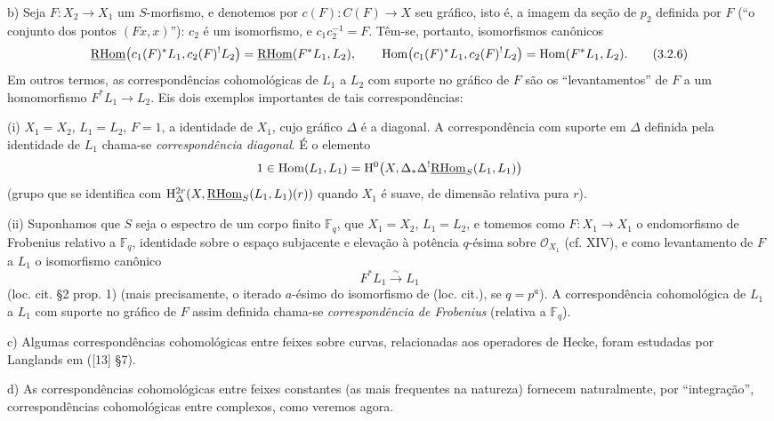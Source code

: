 b) Seja $F:X_2\to X_1$ um $S$-morfismo, e denotemos por $c(F):C(F)\to X$ seu gráfico, isto é, a imagem da seção de $p_2$ definida por $F$ (``o conjunto dos pontos $(Fx,x)$''): $c_2$ é um isomorfismo, e $c_1c_2^{-1}=F$. Têm-se, portanto, isomorfismos canônicos
\begin{equation}
\underline{\mathrm{RHom}}\bigl(c_1(F)^*L_1,c_2(F)^!L_2\bigr)=\underline{\mathrm{RHom}}(F^*L_1,L_2),
\qquad
\operatorname{Hom}\bigl(c_1(F)^*L_1,c_2(F)^!L_2\bigr)=\operatorname{Hom}(F^*L_1,L_2).
\tag{3.2.6}
\end{equation}
Em outros termos, as correspondências cohomológicas de $L_1$ a $L_2$ com suporte no gráfico de $F$ são os ``levantamentos'' de $F$ a um homomorfismo $F^*L_1\to L_2$. Eis dois exemplos importantes de tais correspondências:

(i) $X_1=X_2$, $L_1=L_2$, $F=1$, a identidade de $X_1$, cujo gráfico $\Delta$ é a diagonal. A correspondência com suporte em $\Delta$ definida pela identidade de $L_1$ chama-se \emph{correspondência diagonal}. É o elemento
\[
1\in \operatorname{Hom}(L_1,L_1)=\mathrm{H}^0\bigl(X,\Delta_*\Delta^!\underline{\mathrm{RHom}}_S(L_1,L_1)\bigr)
\]
(grupo que se identifica com $\mathrm{H}^{2r}_\Delta(X,\underline{\mathrm{RHom}}_S(L_1,L_1)(r))$ quando $X_1$ é suave, de dimensão relativa pura $r$).

(ii) Suponhamos que $S$ seja o espectro de um corpo finito $\mathbb F_q$, que $X_1=X_2$, $L_1=L_2$, e tomemos como $F:X_1\to X_1$ o endomorfismo de Frobenius relativo a $\mathbb F_q$, identidade sobre o espaço subjacente e elevação à potência $q$-ésima sobre $\mathcal O_{X_1}$ (cf. XIV), e como levantamento de $F$ a $L_1$ o isomorfismo canônico
\[
F^*L_1\xrightarrow{\sim}L_1
\]
(loc. cit. §2 prop. 1) (mais precisamente, o iterado $a$-ésimo do isomorfismo de (loc. cit.), se $q=p^a$). A correspondência cohomológica de $L_1$ a $L_1$ com suporte no gráfico de $F$ assim definida chama-se \emph{correspondência de Frobenius} (relativa a $\mathbb F_q$).

c) Algumas correspondências cohomológicas entre feixes sobre curvas, relacionadas aos operadores de Hecke, foram estudadas por Langlands em ([13] §7).

d) As correspondências cohomológicas entre feixes constantes (as mais frequentes na natureza) fornecem naturalmente, por ``integração'', correspondências cohomológicas entre complexos, como veremos agora.
